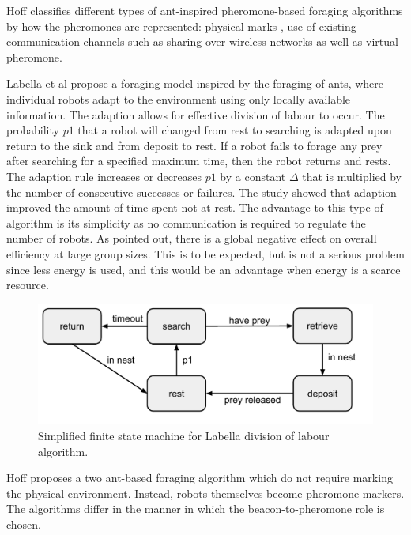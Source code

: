Hoff \cite{hoff2010two} classifies different types of ant-inspired pheromone-based foraging algorithms by how the pheromones are represented: physical marks \cite{alcoholfromants2012}, use of existing communication channels such as sharing over wireless networks as well as virtual pheromone. %

Labella et al \cite{labella2006division} propose a foraging model inspired by the foraging of ants, where individual robots adapt to the environment using only locally available information. The adaption allows for effective division of labour to occur. The probability $p1$ that a robot will changed from rest to searching is adapted upon return to the sink and from deposit to rest. If a robot fails to forage any prey after searching for a specified maximum time, then the robot returns and rests. 
The adaption rule increases or decreases $p1$ by a constant $\Delta$ that is multiplied by the number of consecutive successes or failures. The study showed that adaption improved the amount of time spent not at rest. The advantage to this type of algorithm is its simplicity as no communication is required to regulate the number of robots. As pointed out, there is a global negative effect on overall efficiency at large group sizes. This is to be expected, but is not a serious problem since less energy is used, and this would be an advantage when energy is a scarce resource. %

\begin{figure}
\includegraphics[width=\textwidth]{chapters/chapter2/figures/LabellaFSM.pdf}
\caption{Simplified finite state machine for Labella division of labour algorithm. }
\end{figure} 

Hoff \cite{hoff2010two} proposes a two ant-based foraging algorithm which do not require marking the physical environment. Instead, robots themselves become pheromone markers. The algorithms differ in the manner in which the beacon-to-pheromone role is chosen. 

